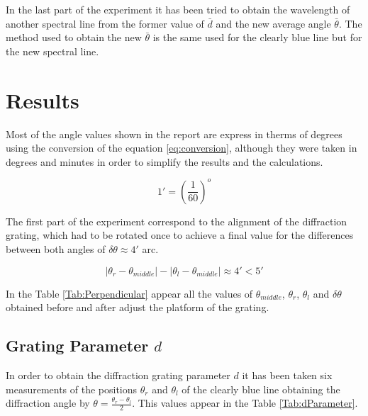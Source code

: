 \documentclass[twoside]{article}
\newcommand{\cl}{clearly blue }
\begin{document}
\begin{multicols}{2}
			In the last part of the experiment it has been tried to obtain the wavelength of another spectral line from the former value of $\bar{d}$ and the new average angle $\bar{\theta}$. The method used to obtain the new $\bar{\theta}$ is the same used for the \cl line but for the new spectral line.
 
		\section{Results}

			Most of the angle values shown in the report are express in therms of degrees using the conversion of the equation \ref{eq:conversion}, although they were taken in degrees and minutes in order to simplify the results and the calculations.

				\begin{equation}
					1' = \left(\frac{1}{60}\right)^o
					\label{eq:conversion}
				\end{equation}

			The first part of the experiment correspond to the alignment of the diffraction grating, which had to be rotated once to achieve a final value for the differences between both angles of $\delta \theta \approx 4'$ arc.

				\begin{equation}
					|\theta_r - \theta_{middle}| - |\theta_l - \theta_{middle}| \approx 4' < 5'
					\label{eq:perpendicular}
				\end{equation}

			In the Table \ref{Tab:Perpendicular} appear all the values of $\theta_{middle}$, $\theta_{r}$, $\theta_{l}$ and $\delta \theta$ obtained before and after adjust the platform of the grating.


			\subsection{Grating Parameter  \texorpdfstring{$d$}{TEXT}}
				\label{sec:dPara}

				In order to obtain the diffraction grating parameter $d$ it has been taken six measurements of the positions $\theta_r$ and $\theta_l$ of the \cl line obtaining the diffraction angle by $\theta = \frac{\theta_r-\theta_l}{2}$. This values appear in the Table \ref{Tab:dParameter}.

					


\end{multicols}
\end{document}

